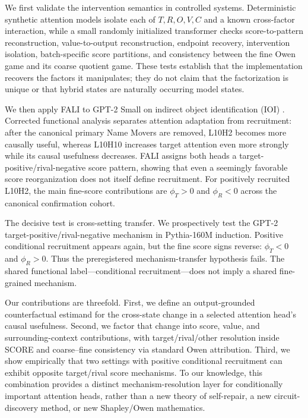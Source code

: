 We first validate the intervention semantics in controlled systems. Deterministic synthetic attention models isolate each of $T,R,O,V,C$ and a known cross-factor interaction, while a small randomly initialized transformer checks score-to-pattern reconstruction, value-to-output reconstruction, endpoint recovery, intervention isolation, batch-specific score partitions, and consistency between the fine Owen game and its coarse quotient game. These tests establish that the implementation recovers the factors it manipulates; they do not claim that the factorization is unique or that hybrid states are naturally occurring model states.

We then apply FALI to GPT-2 Small on indirect object identification (IOI) \citep{wang2023ioi}. Corrected functional analysis separates attention adaptation from recruitment: after the canonical primary Name Movers are removed, L10H2 becomes more causally useful, whereas L10H10 increases target attention even more strongly while its causal usefulness decreases. FALI assigns both heads a target-positive/rival-negative score pattern, showing that even a seemingly favorable score reorganization does not itself define recruitment. For positively recruited L10H2, the main fine-score contributions are $\phi_T>0$ and $\phi_R<0$ across the canonical confirmation cohort.

The decisive test is cross-setting transfer. We prospectively test the GPT-2 target-positive/rival-negative mechanism in Pythia-160M induction. Positive conditional recruitment appears again, but the fine score signs reverse: $\phi_T<0$ and $\phi_R>0$. Thus the preregistered mechanism-transfer hypothesis fails. The shared functional label---conditional recruitment---does not imply a shared fine-grained mechanism.

Our contributions are threefold. First, we define an output-grounded counterfactual estimand for the cross-state change in a selected attention head's causal usefulness. Second, we factor that change into score, value, and surrounding-context contributions, with target/rival/other resolution inside SCORE and coarse--fine consistency via standard Owen attribution. Third, we show empirically that two settings with positive conditional recruitment can exhibit opposite target/rival score mechanisms. To our knowledge, this combination provides a distinct mechanism-resolution layer for conditionally important attention heads, rather than a new theory of self-repair, a new circuit-discovery method, or new Shapley/Owen mathematics.
